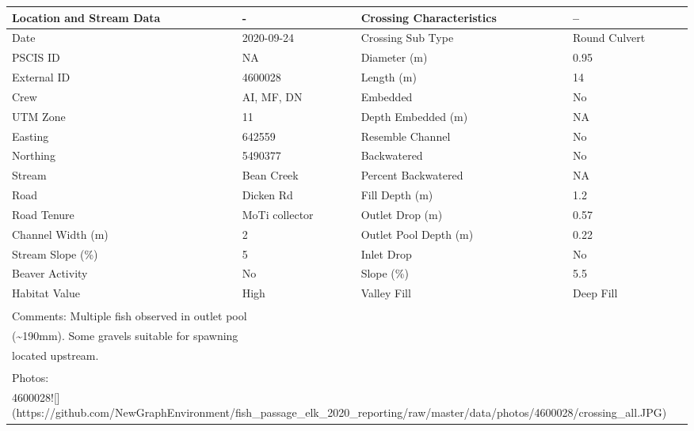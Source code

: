 \documentclass[
]{book}
\begin{document}
\begin{tabular}{l|l|l|l}
\hline
Location and Stream Data & - & Crossing Characteristics & --\\
\hline
Date & 2020-09-24 & Crossing Sub Type & Round Culvert\\
\hline
PSCIS ID & NA & Diameter (m) & 0.95\\
\hline
External ID & 4600028 & Length (m) & 14\\
\hline
Crew & AI, MF, DN & Embedded & No\\
\hline
UTM Zone & 11 & Depth Embedded (m) & NA\\
\hline
Easting & 642559 & Resemble Channel & No\\
\hline
Northing & 5490377 & Backwatered & No\\
\hline
Stream & Bean Creek & Percent Backwatered & NA\\
\hline
Road & Dicken Rd & Fill Depth (m) & 1.2\\
\hline
Road Tenure & MoTi collector & Outlet Drop (m) & 0.57\\
\hline
Channel Width (m) & 2 & Outlet Pool Depth (m) & 0.22\\
\hline
Stream Slope (\%) & 5 & Inlet Drop & No\\
\hline
Beaver Activity & No & Slope (\%) & 5.5\\
\hline
Habitat Value & High & Valley Fill & Deep Fill\\
\hline
\multicolumn{4}{l}{\textsuperscript{} Comments: Multiple fish observed in outlet pool}\\
\multicolumn{4}{l}{(\textasciitilde{}190mm).  Some gravels suitable for spawning}\\
\multicolumn{4}{l}{located upstream.}\\
\multicolumn{4}{l}{\textsuperscript{} Photos:}\\
\multicolumn{4}{l}{4600028![](https://github.com/NewGraphEnvironment/fish\_passage\_elk\_2020\_reporting/raw/master/data/photos/4600028/crossing\_all.JPG)}\\
\end{tabular}
\end{document}
